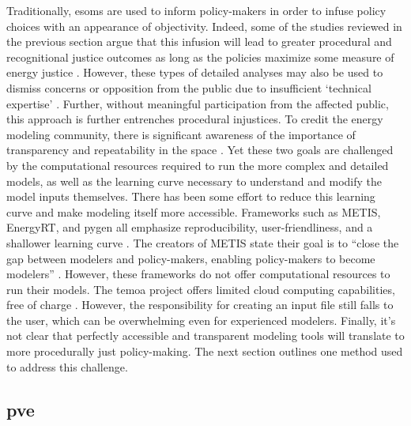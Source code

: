 Traditionally, \acp{esom} are used to inform policy-makers \cite{li_open_2020} in order
to infuse policy choices with an appearance of objectivity. Indeed, some of the studies reviewed in
the previous section argue that this infusion will lead to greater procedural and 
recognitional justice outcomes as long as the policies maximize some measure of energy 
justice \cite{chapman_prioritizing_2018, heffron_resolving_2015}. However, these types of 
detailed analyses may also be used to dismiss concerns or opposition from the public due 
to insufficient `technical expertise' \cite{johnson_dakota_2021}. Further, without 
meaningful participation from the affected public, this approach is further entrenches procedural injustices.
To credit the energy modeling community, there is significant awareness of the importance
of transparency and repeatability in the space \cite{decarolis_case_2012, pfenninger_energy_2014, pfenninger_openmod_nodate, forster_open_2022, hilpert_open_2018}. 
Yet these two goals are challenged by the computational resources required to run the more
complex and detailed models, as well as the learning curve necessary to understand and 
modify the model inputs themselves. There has been some effort to reduce this learning
curve and make modeling itself more accessible. Frameworks such as METIS, EnergyRT, and \ac{pygen} all emphasize reproducibility, user-friendliness, and a shallower
learning curve \cite{sakellaris_metis_2018, lugovoy_energyrt_2022, dotson_python_2021}. The creators of METIS state their goal is to ``close the gap between modelers and policy-makers, enabling policy-makers to become modelers'' \cite{sakellaris_metis_2018}. However, these frameworks do not offer computational resources to run their models. The
\ac{temoa} project offers limited cloud computing capabilities, free of charge \cite{temoa_project_temoa_2023}. However, the responsibility for creating an input file still falls to the user, which can be overwhelming even for experienced modelers. Finally,
it's not clear that perfectly accessible and transparent modeling tools will translate to
more procedurally just policy-making. The next section outlines one method used to 
address this challenge.

\subsection{\Acl{pve}}

